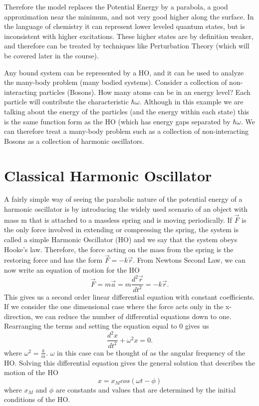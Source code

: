 \documentclass{article}
\newcommand{\be}{\begin{equation}}
\newcommand{\ee}{\end{equation}}
\begin{document}
Therefore the model replaces the Potential Energy by a parabola, a good approximation near the minimum, and not very good higher along the surface.
In the language of chemistry it can represent lower leveled quantum states, but is inconsistent with higher excitations.
These higher states are by definition weaker, and therefore can be treated by techniques like Perturbation Theory (which will be covered later in the course).

Any bound system can be represented by a HO, and it can be used to analyze the many-body problem (many bodied systems).
Consider a collection of non-interacting particles (Bosons).
How many atoms can be in an energy level?
Each particle will contribute the characteristic $\hbar \omega$.
Although in this example we are talking about the energy of the particles (and the energy within each state) this is the same function  form as the HO (which has energy gaps separated by $\hbar \omega$.
We can therefore treat a many-body problem such as a collection of non-interacting Bosons as a collection of harmonic oscillators.

\section{Classical Harmonic Oscillator}
A fairly simple way of seeing the parabolic nature of the potential energy of a harmonic oscillator is by introducing the widely used scenario of an object with mass m that
is attached to a massless spring and is moving periodically. If $\vec{F}$ is the only force involved in extending or compressing the spring, the system is called a simple
Harmonic Oscillator (HO) and we say that the system obeys Hooke's law. Therefore, the force acting on the mass from the spring is the restoring force and has the form $\vec{F} = - k \vec{r}$.
From Newtons Second Law, we can now write an equation of motion for the HO
\be
\vec{F}=m\vec{a}=m\frac{d^2\vec{r}}{dt^2}=-k\vec{r} .
\ee
This gives us a second order linear differential equation with constant coefficients. If we consider the one dimensional case where the force acts only in the x-direction, we
can reduce the number of differential equations down to one. Rearranging the terms and setting the equation equal to 0 gives us
\be
\frac{d^2x}{dt^2} + \omega^2 x = 0.
\ee
where $\omega^2 = \frac{k}{m}$. $\omega$ in this case can be thought of as the angular frequency of the HO. Solving this differential equation gives the general solution that
describes the motion of the HO
\be
x=x_Mcos(\omega t - \phi)
\ee
where $x_M$ and $\phi$ are constants and values that are determined by the initial conditions of the HO.
\end{document}
